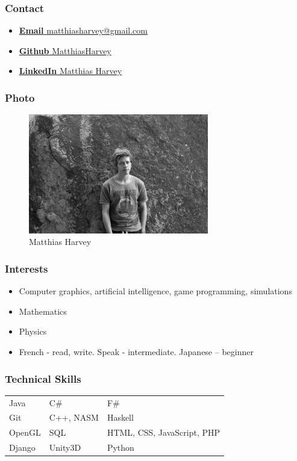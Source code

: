\documentclass{article}
\begin{document}
	\subsubsection{Contact}
	\begin{itemize}
		\item \href{mailto:matthiasharvey@gmail.com}{\textbf{Email} matthiasharvey@gmail.com}
		\item \href{https://github.com/MatthiasHarvey}{\textbf{Github} MatthiasHarvey}	
		\item \href{https://za.linkedin.com/in/matthias-harvey-68b30995}{\textbf{LinkedIn} Matthias Harvey}
	\end{itemize}
	\subsubsection{Photo}
	\begin{figure}[H]
		\centering
		\includegraphics[width=0.7\textwidth]{../matthias.jpg}
		\caption{Matthias Harvey}
	\end{figure}
	\subsubsection{Interests}
	\begin{itemize}
		\item Computer graphics, artificial intelligence, game programming, simulations
		\item Mathematics
		\item Physics
		\item French - read, write. Speak - intermediate. Japanese – beginner
	\end{itemize}
	\subsubsection{Technical Skills}
	
	\begin{tabular}{| l | l | l |}
		Java   & C\#     & F\#                          \\
		Git    & C++, NASM     & Haskell                     \\
		OpenGL & SQL     & HTML, CSS, JavaScript, PHP   \\
		Django & Unity3D & Python                     
	\end{tabular}
\end{document}
